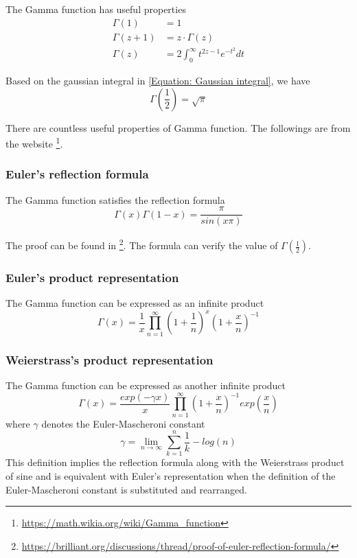 The Gamma function has useful properties
\begin{align*}
    \Gamma(1)   & = 1                                    \\
    \Gamma(z+1) & = z \cdot \Gamma(z)                    \\
    \Gamma(z)   & = 2 \int_0^\infty t^{2z-1} e^{-t^2} dt
\end{align*}

Based on the gaussian integral in \eqref{Equation: Gaussian integral}, we have
\begin{equation*}
    \Gamma(\frac{1}{2}) = \sqrt{\pi}
\end{equation*}

There are countless useful properties of Gamma function.
The followings are from the website \footnote{\url{https://math.wikia.org/wiki/Gamma_function}}.

\subsubsection{Euler's reflection formula}
The Gamma function satisfies the reflection formula
\begin{equation}
    \label{Equation: Euler's reflection formula}
    \Gamma(x) \Gamma(1-x) = \frac{\pi}{sin(x \pi)}
\end{equation}

The proof can be found in \footnote{\url{https://brilliant.org/discussions/thread/proof-of-euler-reflection-formula/}}.
The formula can verify the value of $\Gamma(\frac{1}{2})$.

\subsubsection{Euler's product representation}
The Gamma function can be expressed as an infinite product
\begin{equation}
    \label{Equation: Euler's product representation}
    \Gamma(x) = \frac{1}{x}
    \prod_{n=1}^{\infty} (1 + \frac{1}{n}) ^ {x} (1 + \frac{x}{n})^{-1}
\end{equation}

\subsubsection{Weierstrass's product representation}
The Gamma function can be expressed as another infinite product
\begin{equation}
    \label{Equation: Weierstrass's product representation}
    \Gamma(x) = \frac{exp(-\gamma x)}{x}
    \prod_{n=1}^{\infty} (1+\frac{x}{n})^{-1} exp(\frac{x}{n})
\end{equation}
where $\gamma$ denotes the Euler-Mascheroni constant
\begin{equation}
    \label{Equation: Euler-Mascheroni constant}
    \gamma = \lim_{n \rightarrow \infty}
    \sum_{k=1}^{n} \frac{1}{k} - log(n)
\end{equation}
This definition implies the reflection formula along with the Weierstrass product of sine and is equivalent with Euler's representation when the definition of the Euler-Mascheroni constant is substituted and rearranged.

